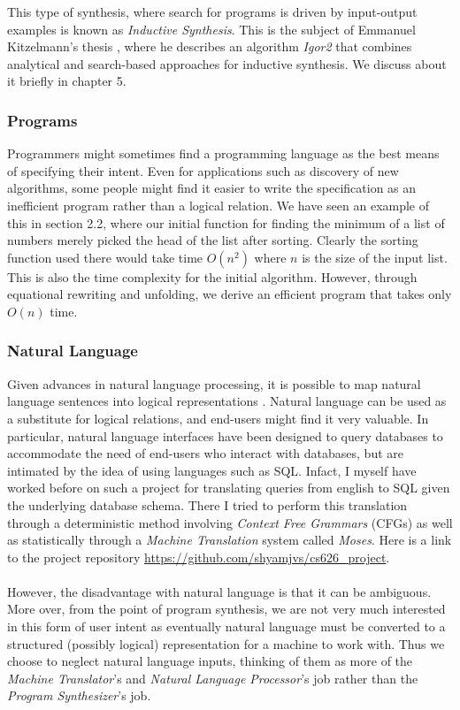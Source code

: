 This type of synthesis, where search for programs is driven by input-output examples is known as \emph{Inductive Synthesis}. This is the subject of Emmanuel Kitzelmann's thesis \cite{kitzelmann2011combined}, where he describes an algorithm \emph{Igor2} that combines analytical and search-based approaches for inductive synthesis. We discuss about it briefly in chapter 5.

\subsubsection{Programs}
Programmers might sometimes find a programming language as the best means of specifying their intent. Even for applications such as discovery of new algorithms, some people might find it easier to write the specification as an inefficient program rather than a logical relation. We have seen an example of this in section 2.2, where our initial function for finding the minimum of a list of numbers merely picked the head of the list after sorting. Clearly the sorting function used there would take time $O(n^2)$ where $n$ is the size of the input list. This is also the time complexity for the initial algorithm. However, through equational rewriting and unfolding, we derive an efficient program that takes only $O(n)$ time.

\subsubsection{Natural Language}
Given advances in natural language processing, it is possible to map
natural language sentences into logical representations \cite{zettlemoyer2009learning}. Natural language can be used as a substitute for logical relations, and end-users might find it very valuable. In particular, natural language interfaces have been designed to query databases to accommodate the need of end-users who interact with databases, but are intimated by the idea of using languages such as SQL. Infact, I myself have worked before on such a project for translating queries from english to SQL given the underlying database schema. There I tried to perform this translation through a deterministic method involving \emph{Context Free Grammars} (CFGs) as well as statistically through a \emph{Machine Translation} system called \emph{Moses}. Here is a link to the project repository \url{https://github.com/shyamjvs/cs626_project}. \\\\
However, the disadvantage with natural language is that it can be ambiguous. More over, from the point of program synthesis, we are not very much interested in this form of user intent as eventually natural language must be converted to a structured (possibly logical) representation for a machine to work with. Thus we choose to neglect natural language inputs, thinking of them as more of the \emph{Machine Translator}'s and \emph{Natural Language Processor}'s job rather than the \emph{Program Synthesizer}'s job.


